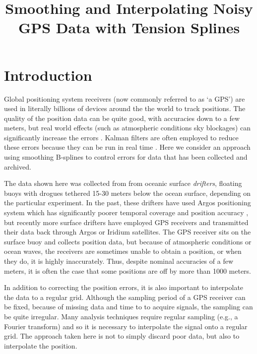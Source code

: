 \documentclass[twocol]{ametsoc}
\title{Smoothing and Interpolating Noisy GPS Data with Tension Splines}
\affiliation{NorthWest Research Associates}
\begin{document}
\maketitle

\section{Introduction}
Global positioning system receivers (now commonly referred to as `a GPS') are used in literally billions of devices around the the world to track positions. The quality of the position data can be quite good, with accuracies down to a few meters, but real world effects (such as atmospheric conditions sky blockages) can significantly increase the errors \citep{faa2016-report}. Kalman filters are often employed to reduce these errors because they can be run in real time \citep{brown1997-book}. Here we consider an  approach using smoothing B-splines to control errors for data that has been collected and archived.

The data shown here was collected from from oceanic surface \emph{drifters}, floating buoys with drogues tethered 15-30 meters below the ocean surface, depending on the particular experiment. In the past, these drifters have used Argos positioning system which has significantly poorer temporal coverage and position accuracy \citep{elipot2016-jgr}, but recently more surface drifters have employed GPS receivers and transmitted their data back through Argos or Iridium satellites. The GPS receiver sits on the surface buoy and collects position data, but because of atmospheric conditions or ocean waves, the receivers are sometimes unable to obtain a position, or when they do, it is highly inaccurately. Thus, despite nominal accuracies of a few meters, it is often the case that some positions are off by more than 1000 meters.

In addition to correcting the position errors, it is also important to interpolate the data to a regular grid. Although the sampling period of a GPS receiver can be fixed, because of missing data and time to to acquire signals, the sampling can be quite irregular.  Many analysis techniques require regular sampling (e.g., a Fourier transform) and so it is necessary to interpolate the signal onto a regular grid. The approach taken here is not to simply discard poor data, but also to interpolate the position.
\end{document}
